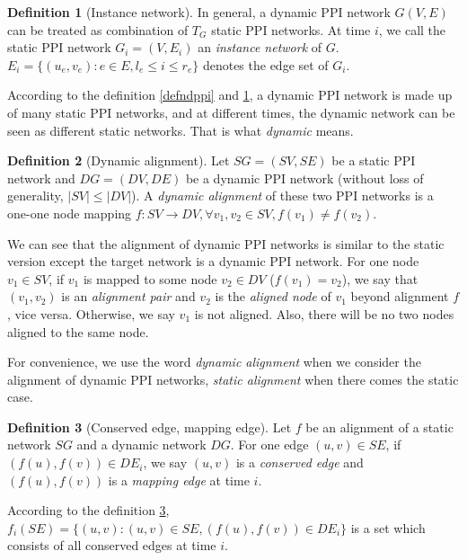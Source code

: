 \documentclass{bioinfo}
\theoremstyle{definition}
\newtheorem{defn}{\textbf{Definition}}[section]%
\begin{document}
\begin{methods}
\begin{defn}[Instance network]
\label{defninstance}
In general, a dynamic PPI network $G(V,E)$ can be treated as combination of $T_G$ static PPI networks. At time $i$, we call the static PPI network $G_i=(V,E_i)$ an \textit{instance network} of $G$. $E_i=\{(u_e,v_e):e\in E,l_e\leq i\leq r_e\}$ denotes the edge set of $G_i$.
\end{defn}

According to the definition \ref{defndppi} and \ref{defninstance}, a dynamic PPI network is made up of many static PPI networks, and at different times, the dynamic network can be seen as different static networks. That is what \textit{dynamic} means.

\begin{defn}[Dynamic alignment]
\label{defndppigna}
Let $SG=(SV,SE)$ be a static PPI network and $DG=(DV,DE)$ be a dynamic PPI network (without loss of generality, $|SV|\leq |DV|$). A \textit{dynamic alignment} of these two PPI networks is a one-one node mapping $f:SV\rightarrow DV,\forall v_1,v_2\in SV,f(v_1)\neq f(v_2)$. 
\end{defn}

We can see that the alignment of dynamic PPI networks is similar to the static version except the target network is a dynamic PPI network. For one node $v_1\in SV$, if $v_1$ is mapped to some node $v_2\in DV$ ($f(v_1)=v_2$), we say that $(v_1,v_2)$ is an \textit{alignment pair} and $v_2$ is the \textit{aligned node} of $v_1$ beyond alignment $f$, vice versa. Otherwise, we say $v_1$ is not aligned. Also, there will be no two nodes aligned to the same node.

For convenience, we use the word \textit{dynamic alignment} when we consider the alignment of dynamic PPI networks, \textit{static alignment} when there comes the static case.

\begin{defn}[Conserved edge, mapping edge]
\label{defnceme}
Let $f$ be an alignment of a static network $SG$ and a dynamic network $DG$. For one edge $(u,v)\in SE$, if $(f(u),f(v))\in DE_i$, we say $(u,v)$ is a \textit{conserved edge} and $(f(u),f(v))$ is a \textit{mapping edge} at time $i$. 
\end{defn}

According to the definition \ref{defnceme}, $f_i(SE)=\{(u,v):(u,v)\in SE,(f(u),f(v))\in DE_i\}$ is a set which consists of all conserved edges at time $i$. 


\end{methods}
\end{document}
